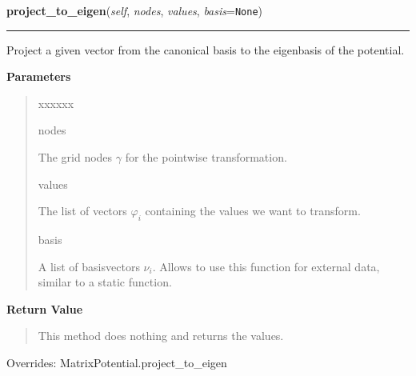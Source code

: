 \hspace{.8\funcindent}\begin{boxedminipage}{\funcwidth}

    \raggedright \textbf{project\_to\_eigen}(\textit{self}, \textit{nodes}, \textit{values}, \textit{basis}={\tt None})

    \vspace{-1.5ex}

    \rule{\textwidth}{0.5\fboxrule}
\setlength{\parskip}{2ex}
    Project a given vector from the canonical basis to the eigenbasis of
    the potential.

\setlength{\parskip}{1ex}
      \textbf{Parameters}
      \vspace{-1ex}

      \begin{quote}
        \begin{Ventry}{xxxxxx}

          \item[nodes]

          The grid nodes $\gamma$ for the pointwise
          transformation.

          \item[values]

          The list of vectors $\varphi_i$ containing the
          values we want to transform.

          \item[basis]

          A list of basisvectors $\nu_i$. Allows to use this function for
          external data, similar to a static function.

        \end{Ventry}

      \end{quote}

      \textbf{Return Value}
    \vspace{-1ex}

      \begin{quote}
      This method does nothing and returns the values.

      \end{quote}

      Overrides: MatrixPotential.project\_to\_eigen

    \end{boxedminipage}

    \vspace{0.5ex}

